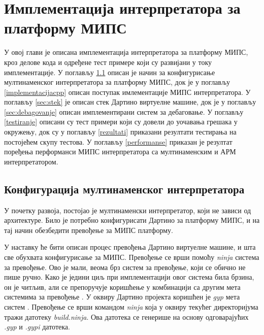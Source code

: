 \documentclass[12pt,oneside]{memoir}
\begin{document}
\chapter{Имплементација интерпретатора за платформу МИПС}
\label{chp:implementacija}
У овој глави је описана имплементација интерпретатора за платформу МИПС, кроз делове кода и одређене тест примере који су развијани у току имплементације. У поглављу \ref{konfigurisanje} описан је начин за конфигурисање мултинаменског интерпретатора за платформу МИПС, док је у поглављу \ref{implementacijacpp} описан поступак имлементације МИПС интерпретатора. У поглављу \ref{sec:stek} је описан стек Дартино виртуелне машине, док је у поглављу \ref{sec:debagovanje} описан имплементирани систем за дебаговање. У поглављу \ref{testiranje} описани су тест примери који су довели до уочавања грешака у окружењу, док су у поглављу \ref{rezultati} приказани резултати тестирања на постојећем скупу тестова. У поглављу \ref{performanse} приказан је резултат поређења перформанси МИПС интерпретатора са мултинаменским и АРМ интерпретатором.

\section{Конфигурација мултинаменског интерпретатора}
\label{konfigurisanje}
У почетку развоја, постојао је мултинаменски интерпретатор, који не зависи од архитектуре. Било је потребно конфигурисати Дартино за платформу МИПС, и на тај начин обезбедити превођење за МИПС платформу. 

У наставку ће бити описан процес превођења Дартино виртуелне машине, и шта све обухвата конфигурисање за МИПС.
Превођење се врши помоћу \textit{ninja} система за превођење. Ово је мали, веома брз систем за превођење, који се обично не пише ручно. Како је једини циљ при имплементацији овог система била брзина, он је читљив, али се препоручује коришћење у комбинацији са другим мета системима за превођење \cite{ninja}. У оквиру Дартино пројекта коришћен је \textit{gyp} мета систем \cite{gyp}. Превођење се врши командом \textit{ninja} која у оквиру текућег директоријума тражи датотеку \textit{build.ninja}. Ова датотека се генерише на основу одговарајућих \textit{.gyp} и \textit{.gypi} датотека. 
\end{document}
